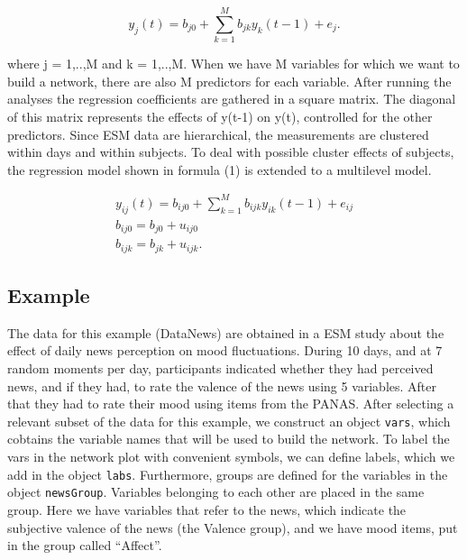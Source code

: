 \documentclass[man,floatsintext]{apa6}
\theoremstyle{definition}
\theoremstyle{definition}
\theoremstyle{definition}
\theoremstyle{remark}
\begin{document}
\begin{equation}
 y_j(t) = b_{j0} + \sum_{k=1}^{M} b_{jk} y_k(t-1) + e_j.
\end{equation}

where j = 1,..,M and k = 1,..,M. When we have M variables for which we
want to build a network, there are also M predictors for each variable.
After running the analyses the regression coefficients are gathered in a
square matrix. The diagonal of this matrix represents the effects of
y(t-1) on y(t), controlled for the other predictors. Since ESM data are
hierarchical, the measurements are clustered within days and within
subjects. To deal with possible cluster effects of subjects, the
regression model shown in formula (1) is extended to a multilevel model.

\begin{equation}
 \begin{split}
y_{ij}(t) = b_{ij0} + \sum_{k=1}^{M} b_{ijk} y_{ik}(t-1) + e_{ij}\\
b_{ij0} = b_{j0} + u_{ij0}\\ 
b_{ijk} = b_{jk} + u_{ijk}. 
 \end{split}
\end{equation}

\subsection{Example}\label{example}

The data for this example (DataNews) are obtained in a ESM study about
the effect of daily news perception on mood fluctuations. During 10
days, and at 7 random moments per day, participants indicated whether
they had perceived news, and if they had, to rate the valence of the
news using 5 variables. After that they had to rate their mood using
items from the PANAS. After selecting a relevant subset of the data for
this example, we construct an object \texttt{vars}, which cobtains the
variable names that will be used to build the network. To label the vars
in the network plot with convenient symbols, we can define labels, which
we add in the object \texttt{labs}. Furthermore, groups are defined for
the variables in the object \texttt{newsGroup}. Variables belonging to
each other are placed in the same group. Here we have variables that
refer to the news, which indicate the subjective valence of the news
(the Valence group), and we have mood items, put in the group called
\enquote{Affect}.
\end{document}
